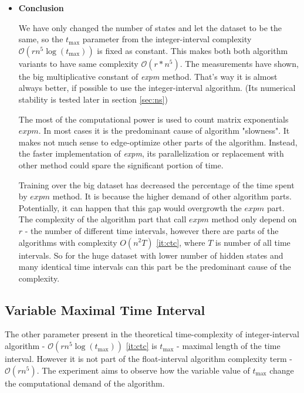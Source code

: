 \documentclass[thesis=M,english]{FITthesis}[2012/10/20]
\begin{document}
\begin{itemize}
\item \textbf{ Conclusion }

We have only changed the number of states and let the dataset to be the same, so the $t_{\max}$ parameter from the integer-interval complexity $\mathcal{O}(r n^5 \log(t_{\max}))$ is fixed as constant. This makes both both algorithm variants to have same complexity $\mathcal{O}(r*n^5)$. The measurements have shown, the big multiplicative constant of \textit{expm} method. That's way it is almost always better, if possible to use the integer-interval algorithm. (Its numerical stability is tested later in section \ref{sec:ns}) 

The most of the computational power is used to count matrix exponentials $expm$. In most cases it is the predominant cause of algorithm "slowness". It makes not much sense to edge-optimize other parts of the algorithm. Instead, the faster implementation of \textit{expm}, its parallelization or replacement with other method could spare the significant portion of time.      

Training over the big dataset \label{fig:e2big} has decreased the percentage of the time spent by $expm$ method. It is because the higher demand of other algorithm parts. Potentially, it can happen that this gap would overgrowth the $expm$ part. The complexity of the algorithm part that call $expm$ method only depend on $r$ - the number of different time intervals, however there are parts of the algorithms with complexity ${O}(n^2T)$ \ref{it:ctc}, where $T$ is number of all time intervals. So for the huge dataset with lower number of hidden states and many identical time intervals can this part be the predominant cause of the complexity.   

\end{itemize}

\subsection{Variable Maximal Time Interval}

The other parameter present in the theoretical time-complexity of integer-interval algorithm - $\mathcal{O}(r n^5 \log(t_{\max}))$ \ref{it:ctc} is $t_{\max}$ - maximal length of the time interval. However it is not part of the float-interval algorithm complexity term - $\mathcal{O}(r n^5)$. The experiment aims to observe how the variable value of $t_{\max}$ change the computational demand of the algorithm.  
\end{document}
